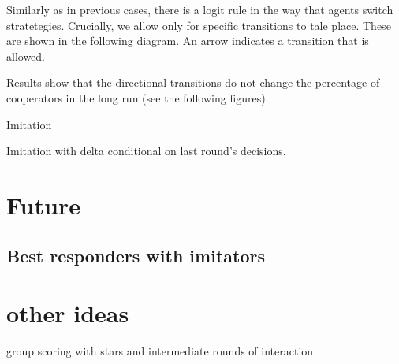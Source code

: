 \documentclass{article}
\begin{document}
Similarly as in previous cases, there is a logit rule in the way that agents switch stratetegies. Crucially, we allow only for specific transitions to tale place. These are shown in the following diagram. An arrow indicates a transition that is allowed. 

\begin{center}
\end{center}

Results show that the directional transitions do not change the percentage of cooperators in the long run (see the following figures).

Imitation

Imitation with delta conditional on last round's decisions.

\section{Future}

\subsection{Best responders with imitators}

\section{other ideas}
group scoring with stars and intermediate rounds of interaction

\end{document}
